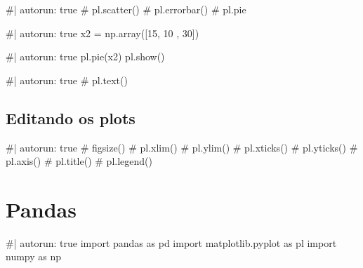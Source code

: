 \documentclass[
  letterpaper,
  DIV=11,
  numbers=noendperiod]{scrreprt}
\newenvironment{Shaded}{\begin{snugshade}}{\end{snugshade}}
\newcommand{\NormalTok}[1]{\textcolor[rgb]{0.00,0.23,0.31}{#1}}
\begin{document}
\begin{Shaded}
\begin{Highlighting}[]
\NormalTok{\#| autorun: true}
\NormalTok{\# pl.scatter()}
\NormalTok{\# pl.errorbar()}
\NormalTok{\# pl.pie}
\end{Highlighting}
\end{Shaded}

\begin{Shaded}
\begin{Highlighting}[]
\NormalTok{\#| autorun: true}
\NormalTok{x2 = np.array([15, 10 , 30])}
\end{Highlighting}
\end{Shaded}

\begin{Shaded}
\begin{Highlighting}[]
\NormalTok{\#| autorun: true}
\NormalTok{pl.pie(x2)}
\NormalTok{pl.show()}
\end{Highlighting}
\end{Shaded}

\begin{Shaded}
\begin{Highlighting}[]
\NormalTok{\#| autorun: true}
\NormalTok{\# pl.text()}
\end{Highlighting}
\end{Shaded}

\section{Editando os plots}\label{editando-os-plots}

\begin{Shaded}
\begin{Highlighting}[]
\NormalTok{\#| autorun: true}
\NormalTok{\# figsize()}
\NormalTok{\# pl.xlim()}
\NormalTok{\# pl.ylim()}
\NormalTok{\# pl.xticks()}
\NormalTok{\# pl.yticks()}
\NormalTok{\# pl.axis()}
\NormalTok{\# pl.title()}
\NormalTok{\# pl.legend()}
\end{Highlighting}
\end{Shaded}

\chapter{Pandas}\label{pandas}

\begin{Shaded}
\begin{Highlighting}[]
\NormalTok{\#| autorun: true}
\NormalTok{import pandas as pd}
\NormalTok{import matplotlib.pyplot as pl}
\NormalTok{import numpy as np}
\end{Highlighting}
\end{Shaded}
\end{document}
